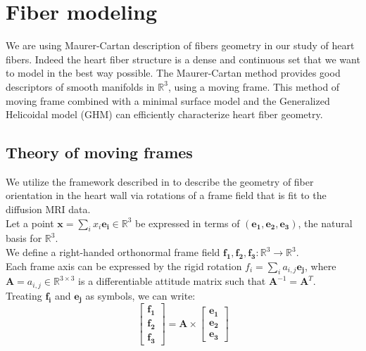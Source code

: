 \section{Fiber modeling}

We are using Maurer-Cartan description of fibers geometry in our study of heart fibers. \cite{pami2015, savadjiev2012heart, piuzephd, levy1935methode} Indeed the heart fiber structure is a dense and continuous set that we want to model in the best way possible. The Maurer-Cartan method provides good descriptors of smooth manifolds in $\mathbb{R}^3$, using a moving frame. This method of moving frame combined with a minimal surface model and the Generalized Helicoidal model (GHM) can efficiently characterize heart fiber geometry.

\subsection{Theory of moving frames}

We utilize the framework described in \cite{de1990ventricular} to describe the geometry of fiber orientation in the heart wall via rotations of a frame field that is fit to the diffusion MRI data. \\
Let a point $\mathbf{x} = \sum_i{x_i\mathbf{e_i}} \in \mathbb{R}^3$ be expressed in terms of $(\mathbf{e_1}, \mathbf{e_2}, \mathbf{e_3})$, the natural basis for $\mathbb{R}^3$. \\
We define a right-handed orthonormal frame field $\mathbf{f_1},\mathbf{f_2},\mathbf{f_3} : \mathbb{R}^3 \to \mathbb{R}^3$. \\ 
Each frame axis can be expressed by the rigid rotation $f_i = \sum_i{a_{i,j}\mathbf{e_j}}$, where $\mathbf{A} = {a_{i,j}} \in \mathbb{R}^{3 \times 3}$ is a differentiable attitude matrix such that $\mathbf{A}^{-1} = \mathbf{A}^T$. \\
Treating $\mathbf{f_i}$ and $\mathbf{e_j}$ as symbols, we can write:
\begin{equation}
\begin{bmatrix}
    \mathbf{f_1} \\
    \mathbf{f_2} \\
    \mathbf{f_3}
\end{bmatrix} = \mathbf{A} \times \begin{bmatrix}
    \mathbf{e_1} \\
    \mathbf{e_2} \\
    \mathbf{e_3}
\end{bmatrix}
\end{equation}

